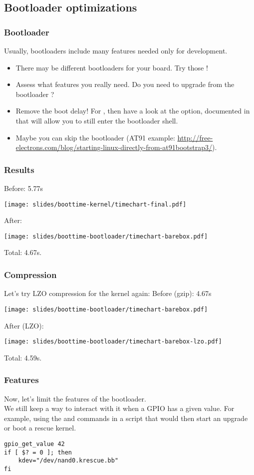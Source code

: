 \subsection{Bootloader optimizations}
\begin{frame}
\frametitle{Bootloader}
Usually, bootloaders include many features needed only for
development.
\begin{itemize}
	\item There may be different bootloaders for your board. Try
		those !
	\item Assess what features you really need. Do you need to
		upgrade from the bootloader ?
	\item Remove the boot delay! For , then have a look
		at the  option, documented in
		 that will allow you to still enter
		the bootloader shell.
	\item Maybe you can skip the bootloader (AT91 example: 
                \url{http://free-electrons.com/blog/starting-linux-directly-from-at91bootstrap3/}).
\end{itemize}
\end{frame}

\begin{frame}
\frametitle{Results}
Before: 5.77s
\begin{center}
    \texttt{[image: slides/boottime-kernel/timechart-final.pdf]}
\end{center}
After:
\begin{center}
    \texttt{[image: slides/boottime-bootloader/timechart-barebox.pdf]}
\end{center}
Total: 4.67s.
\end{frame}

\begin{frame}
\frametitle{Compression}
Let's try LZO compression for the kernel again:
Before (gzip): 4.67s
\begin{center}
    \texttt{[image: slides/boottime-bootloader/timechart-barebox.pdf]}
\end{center}
After (LZO):
\begin{center}
    \texttt{[image: slides/boottime-bootloader/timechart-barebox-lzo.pdf]}
\end{center}
Total: 4.59s.
\end{frame}

\begin{frame}[fragile]
\frametitle{Features}
Now, let's limit the features of the bootloader.\\
We still keep a way to interact with it when a GPIO has a given value.
For example, using the  and
 commands in a script that would then start an
upgrade or boot a rescue kernel.
\begin{block}{}
\begin{verbatim}
gpio_get_value 42
if [ $? = 0 ]; then
    kdev="/dev/nand0.krescue.bb"
fi
\end{verbatim}
\end{block}
\end{frame}

